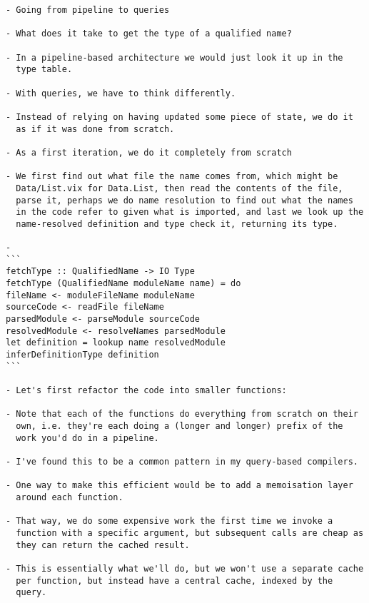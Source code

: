 \documentclass[12pt, a4paper]{report}
\begin{document}
\begin{verbatim}
- Going from pipeline to queries

- What does it take to get the type of a qualified name?

- In a pipeline-based architecture we would just look it up in the
  type table.

- With queries, we have to think differently.

- Instead of relying on having updated some piece of state, we do it
  as if it was done from scratch.

- As a first iteration, we do it completely from scratch

- We first find out what file the name comes from, which might be
  Data/List.vix for Data.List, then read the contents of the file,
  parse it, perhaps we do name resolution to find out what the names
  in the code refer to given what is imported, and last we look up the
  name-resolved definition and type check it, returning its type.

-
```
fetchType :: QualifiedName -> IO Type
fetchType (QualifiedName moduleName name) = do
fileName <- moduleFileName moduleName
sourceCode <- readFile fileName
parsedModule <- parseModule sourceCode
resolvedModule <- resolveNames parsedModule
let definition = lookup name resolvedModule
inferDefinitionType definition
```

- Let's first refactor the code into smaller functions:

- Note that each of the functions do everything from scratch on their
  own, i.e. they're each doing a (longer and longer) prefix of the
  work you'd do in a pipeline.

- I've found this to be a common pattern in my query-based compilers.

- One way to make this efficient would be to add a memoisation layer
  around each function.

- That way, we do some expensive work the first time we invoke a
  function with a specific argument, but subsequent calls are cheap as
  they can return the cached result.

- This is essentially what we'll do, but we won't use a separate cache
  per function, but instead have a central cache, indexed by the
  query.
\end{verbatim}
\end{document}

